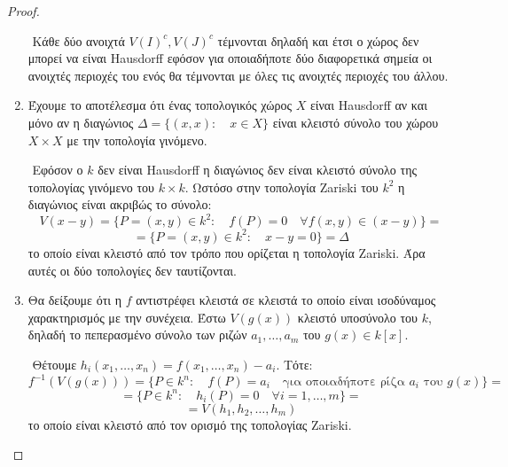 \documentclass[oneside,a4paper]{article}
\newcommand {\tl}{\textlatin}
\begin{document}
\begin{proof}
\begin{enumerate}
		$ $\newline
		Κάθε δύο ανοιχτά $V(I)^c, V(J)^c$ τέμνονται δηλαδή και έτσι ο χώρος δεν μπορεί να είναι \tl{Hausdorff} εφόσον για οποιαδήποτε δύο διαφορετικά σημεία οι ανοιχτές περιοχές του ενός θα τέμνονται με όλες τις ανοιχτές περιοχές του άλλου.

		\item Έχουμε το αποτέλεσμα ότι ένας τοπολογικός χώρος $X$ είναι \tl{Hausdorff} αν και μόνο αν η διαγώνιος $\Delta = \{(x,x): \quad x \in X\}$ είναι κλειστό σύνολο του χώρου $X \times X$ με την τοπολογία γινόμενο. 
		
		$ $\newline
		Εφόσον ο $k$ δεν είναι \tl{Hausdorff} η διαγώνιος δεν είναι κλειστό σύνολο της τοπολογίας γινόμενο του $k \times k$. Ωστόσο στην τοπολογία \tl{Zariski} του $k^2$ η διαγώνιος είναι ακριβώς το σύνολο:
		$$V(x-y) = \{P=(x,y) \in k^2: \quad f(P) = 0 \quad \forall f(x,y) \in (x-y)\} = $$
		$$= \{P = (x,y) \in k^2: \quad x-y = 0 \} = \Delta$$
		το οποίο είναι κλειστό από τον τρόπο που ορίζεται η τοπολογία \tl{Zariski}. Άρα αυτές οι δύο τοπολογίες δεν ταυτίζονται.

		\item Θα δείξουμε ότι η $f$ αντιστρέφει κλειστά σε κλειστά το οποίο είναι ισοδύναμος χαρακτηρισμός με την συνέχεια. Έστω $V(g(x))$ κλειστό υποσύνολο του $k$, δηλαδή το πεπερασμένο σύνολο των ριζών $a_1, \ldots, a_m$ του $g(x) \in k[x]$.
		
		$ $\newline
		Θέτουμε $h_i (x_1,\ldots, x_n) = f(x_1,\ldots, x_n) - a_i$. Τότε:
		$$f^{-1} (V(g(x))) = \{P \in k^n: \quad f(P) = a_i \quad \text{για οποιαδήποτε ρίζα } a_i \text{ του } g(x)\}= $$
		$$= \{P \in k^n: \quad h_i(P) = 0 \quad \forall i =1,\ldots, m \} =$$
		$$= V(h_1,h_2, \ldots, h_m)$$
		το οποίο είναι κλειστό από τον ορισμό της τοπολογίας \tl{Zariski}. 
	\end{enumerate}
\end{proof}

\pagebreak
\pagebreak
\end{document}
